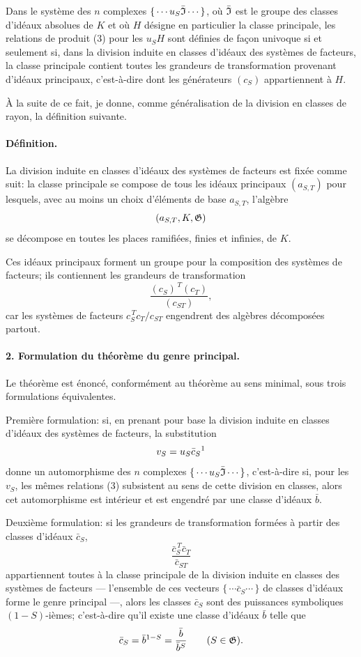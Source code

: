 Dans le système des \(n\) complexes \(\{\,\cdots u_S\bar{\mathfrak I}\cdots\,\}\), où \(\bar{\mathfrak I}\) est le groupe des classes d'idéaux absolues de \(K\) et où \(H\) désigne en particulier la classe principale, les relations de produit (3) pour les \(u_SH\) sont définies de façon univoque si et seulement si, dans la division induite en classes d'idéaux des systèmes de facteurs, la classe principale contient toutes les grandeurs de transformation provenant d'idéaux principaux, c'est-à-dire dont les générateurs \((c_S)\) appartiennent à \(H\).

À la suite de ce fait, je donne, comme généralisation de la division en classes de rayon, la définition suivante.

\paragraph{Définition.}
La division induite en classes d'idéaux des systèmes de facteurs est fixée comme suit: la classe principale se compose de tous les idéaux principaux \((a_{S,T})\) pour lesquels, avec au moins un choix d'éléments de base \(a_{S,T}\), l'algèbre
\[
        (a_{S,T},K,\mathfrak G)
\]
se décompose en toutes les places ramifiées, finies et infinies, de \(K\).

Ces idéaux principaux forment un groupe pour la composition des systèmes de facteurs; ils contiennent les grandeurs de transformation
\[
        \frac{(c_S)^{\,T}(c_T)}{(c_{ST})},
\]
car les systèmes de facteurs \(c_S^{\,T}c_T/c_{ST}\) engendrent des algèbres décomposées partout.

\paragraph{2. Formulation du théorème du genre principal.}
Le théorème est énoncé, conformément au théorème au sens minimal, sous trois formulations équivalentes.

Première formulation: si, en prenant pour base la division induite en classes d'idéaux des systèmes de facteurs, la substitution
\[
        v_S=u_S \bar c_S\text{\footnotemark}
\]
donne un automorphisme des \(n\) complexes \(\{\,\cdots u_S\bar{\mathfrak I}\cdots\,\}\), c'est-à-dire si, pour les \(v_S\), les mêmes relations (3) subsistent au sens de cette division en classes, alors cet automorphisme est intérieur et est engendré par une classe d'idéaux \(\bar b\).

Deuxième formulation: si les grandeurs de transformation formées à partir des classes d'idéaux \(\bar c_S\),
\[
        \frac{\bar c_S^{\,T}\bar c_T}{\bar c_{ST}}
\]
appartiennent toutes à la classe principale de la division induite en classes des systèmes de facteurs --- l'ensemble de ces vecteurs \(\{\,\cdots\bar c_S\cdots\,\}\) de classes d'idéaux forme le genre principal ---, alors les classes \(\bar c_S\) sont des puissances symboliques \((1-S)\)-ièmes; c'est-à-dire qu'il existe une classe d'idéaux \(\bar b\) telle que
\[
        \bar c_S=\bar b^{1-S}=\frac{\bar b}{\bar b^S}
        \qquad(S\in\mathfrak G).
\]

